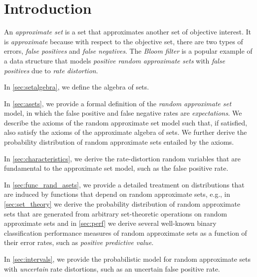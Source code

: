 \documentclass[ ../main.tex]{subfiles}
\begin{document}
\section{Introduction}


An \emph{approximate set} is a set that approximates another set of objective interest.
It is \emph{approximate} because with respect to the objective set, there are two types of errors, \emph{false positives} and \emph{false negatives}.
The \emph{Bloom filter} is a popular example of a data structure that models \emph{positive random approximate sets} with \emph{false positives} due to \emph{rate distortion}.

In \cref{sec:setalgebra}, we define the algebra of sets.

In \cref{sec:asets}, we provide a formal definition of the \emph{random approximate set} model, in which the false positive and false negative rates are \emph{expectations}.
We describe the axioms of the random approximate set model such that, if satisfied, also satisfy the axioms of the approximate algebra of sets.
We further derive the probability distribution of random approximate sets entailed by the axioms.

In \cref{sec:characteristics}, we derive the rate-distortion random variables that are fundamental to the approximate set model, such as the false positive rate.

In \cref{sec:func_rand_asets}, we provide a detailed treatment on distributions that are induced by functions that depend on random approximate sets, e.g., in \cref{sec:set_theory} we derive the probability distribution of random approximate sets that are generated from arbitrary set-theoretic operations on random approximate sets and in \cref{sec:perf} we derive several well-known binary classification performance measures of random approximate sets as a function of their error rates, such as \emph{positive predictive value}.

In \cref{sec:intervals}, we provide the probabilistic model for random approximate sets with \emph{uncertain} rate distortions, such as an uncertain false positive rate.
\end{document}
